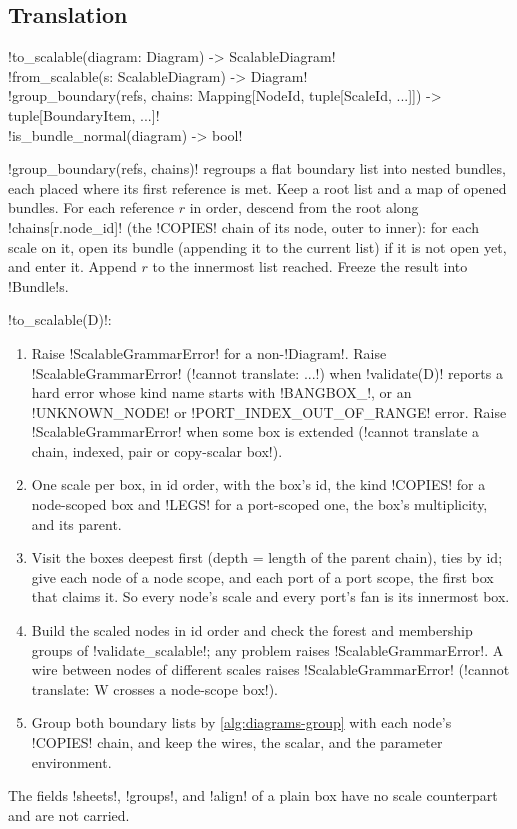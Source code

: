 \subsection{Translation}

\begin{signature}
\py!to_scalable(diagram: Diagram) -> ScalableDiagram!\\
\py!from_scalable(s: ScalableDiagram) -> Diagram!\\
\py!group_boundary(refs, chains: Mapping[NodeId, tuple[ScaleId, ...]]) -> tuple[BoundaryItem, ...]!\\
\py!is_bundle_normal(diagram) -> bool!
\end{signature}

\begin{algorithm}\label{alg:diagrams-group}
\py!group_boundary(refs, chains)! regroups a flat boundary list into nested bundles, each placed where its first reference is met. Keep a root list and a map of opened bundles. For each reference $r$ in order, descend from the root along \py!chains[r.node_id]! (the \code!COPIES! chain of its node, outer to inner): for each scale on it, open its bundle (appending it to the current list) if it is not open yet, and enter it. Append $r$ to the innermost list reached. Freeze the result into \py!Bundle!s.
\end{algorithm}

\begin{algorithm}\label{alg:diagrams-to-scalable}
\py!to_scalable(D)!:
\begin{enumerate}
\item Raise \py!ScalableGrammarError! for a non-\py!Diagram!. Raise \py!ScalableGrammarError! (\code!cannot translate: ...!) when \py!validate(D)! reports a hard error whose kind name starts with \code!BANGBOX_!, or an \code!UNKNOWN_NODE! or \code!PORT_INDEX_OUT_OF_RANGE! error. Raise \py!ScalableGrammarError! when some box is extended (\code!cannot translate a chain, indexed, pair or copy-scalar box!).
\item One scale per box, in id order, with the box's id, the kind \code!COPIES! for a node-scoped box and \code!LEGS! for a port-scoped one, the box's multiplicity, and its parent.
\item Visit the boxes deepest first (depth = length of the parent chain), ties by id; give each node of a node scope, and each port of a port scope, the first box that claims it. So every node's scale and every port's fan is its innermost box.
\item Build the scaled nodes in id order and check the forest and membership groups of \py!validate_scalable!; any problem raises \py!ScalableGrammarError!. A wire between nodes of different scales raises \py!ScalableGrammarError! (\code!cannot translate: W crosses a node-scope box!).
\item Group both boundary lists by \cref{alg:diagrams-group} with each node's \code!COPIES! chain, and keep the wires, the scalar, and the parameter environment.
\end{enumerate}
The fields \py!sheets!, \py!groups!, and \py!align! of a plain box have no scale counterpart and are not carried.
\end{algorithm}

